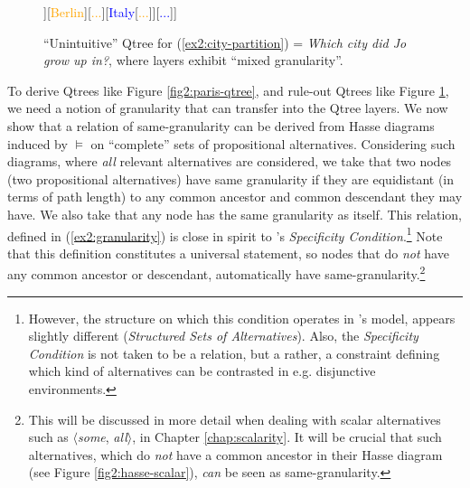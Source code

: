 \begin{figure}[H]
	\centering
		\begin{forest}
			[{CS\\
				Jo grew up in...}[\textcolor{blue}{France}[\textcolor{orange}{{\fbox{Paris}}}][\textcolor{orange}{Lyon}][\textcolor{orange}{...}]][\textcolor{orange}{Berlin}][\textcolor{orange}{...}][\textcolor{blue}{Italy}[\textcolor{orange}{...}]][\textcolor{blue}{...}]]
		\end{forest}
		\caption{``Unintuitive'' Qtree for (\ref{ex2:city-partition}) = \textit{Which city did Jo grow up in?}, where layers exhibit ``mixed granularity''.}\label{fig2:paris-qtree-mixed}
	\end{figure}

To derive Qtrees like Figure \ref{fig2:paris-qtree}, and rule-out Qtrees like Figure \ref{fig2:paris-qtree-mixed}, we need a notion of granularity that can transfer into the Qtree layers. We now show that a relation of same-granularity can be derived from Hasse diagrams induced by $\vDash$ on ``complete'' sets of propositional alternatives. Considering such diagrams, where \textit{all} relevant alternatives are considered, we take that two nodes (two propositional alternatives) have same granularity if they are equidistant (in terms of path length) to any common ancestor and common descendant they may have. We also take that any node has the same granularity as itself. This relation, defined in (\ref{ex2:granularity}) is close in spirit to \citet{Ippolito2019}'s \textit{Specificity Condition}.\footnote{However, the structure on which this condition operates in \citeauthor{Ippolito2019}'s model, appears slightly different (\textit{Structured Sets of Alternatives}). Also, the \textit{Specificity Condition} is not taken to be a relation, but a rather, a constraint defining which kind of alternatives can be contrasted in e.g. disjunctive environments.} Note that this definition constitutes a universal statement, so nodes that do \textit{not} have any common ancestor or descendant, automatically have same-granularity.\footnote{This will be discussed in more detail when dealing with scalar alternatives such as $\langle$\textit{some}, \textit{all}$\rangle$, in Chapter \ref{chap:scalarity}. It will be crucial that such alternatives, which do \textit{not} have a common ancestor in their Hasse diagram (see Figure \ref{fig2:hasse-scalar}), \textit{can} be seen as same-granularity.}

\begin{exe}
	\label{ex2:granularity}
\end{exe}


